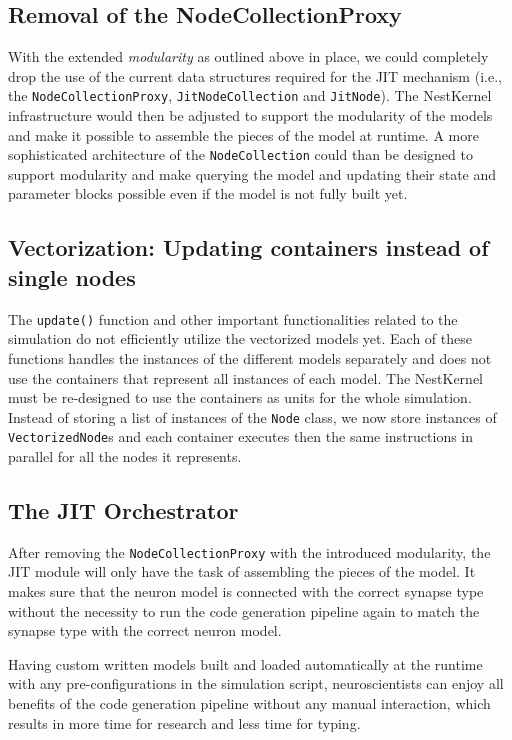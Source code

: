 \subsection*{Removal of the NodeCollectionProxy}

With the extended \emph{modularity} as outlined above in place, we could completely drop the use of the current data structures required for the JIT mechanism (i.e., the \texttt{NodeCollectionProxy}, \texttt{JitNodeCollection} and \texttt{JitNode}). The NestKernel infrastructure would then be adjusted to support the modularity of the models and make it possible to assemble the pieces of the model at runtime. A more sophisticated architecture of the \texttt{NodeCollection} could than be designed to support modularity and make querying the model and updating their state and parameter blocks possible even if the model is not fully built yet.

\subsection*{Vectorization: Updating containers instead of single nodes}

The \texttt{update()} function and other important functionalities related to the simulation do not efficiently utilize the vectorized models yet. Each of these functions handles the instances of the different models separately and does not use the containers that represent all instances of each model. The NestKernel must be re-designed to use the containers as units for the whole simulation. Instead of storing a list of instances of the \texttt{Node} class, we now store instances of \texttt{VectorizedNode}s and each container executes then the same instructions in parallel for all the nodes it represents.

\subsection*{The JIT Orchestrator}

After removing the \texttt{NodeCollectionProxy} with the introduced modularity, the JIT module will only have the task of assembling the pieces of the model. It makes sure that the neuron model is connected with the correct synapse type without the necessity to run the code generation pipeline again to match the synapse type with the correct neuron model.


Having custom written models built and loaded automatically at the runtime with any pre-configurations in the simulation script,  neuroscientists can enjoy all benefits of the code generation pipeline without any manual interaction, which results in more time for research and less time for typing.
\cleardoublepage
